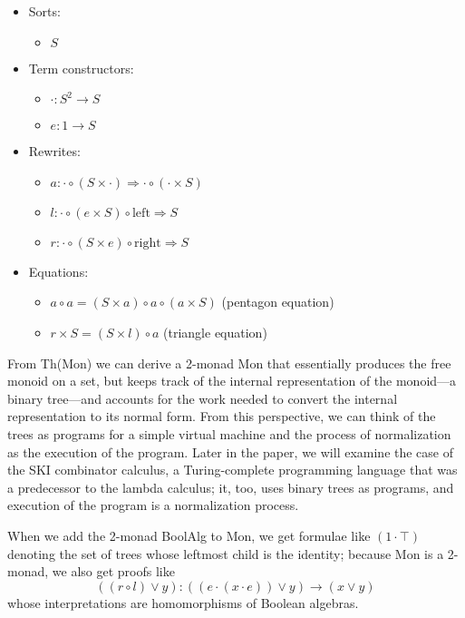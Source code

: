 \documentclass{article}
\newcommand{\maps}{\colon}
\newcommand{\leftu}{\mathrm{left}}
\newcommand{\rightu}{\mathrm{right}}
\begin{document}
\begin{center}
  \begin{itemize}
    \item Sorts:
    \begin{itemize}
      \item $S$
    \end{itemize}
    \item Term constructors:
    \begin{itemize}
      \item $\cdot\maps S^2 \to S$
      \item $e\maps 1 \to S$
    \end{itemize}
    \item Rewrites:
    \begin{itemize}
      \item $a\maps \cdot \circ (S \times \cdot) \Rightarrow \cdot \circ (\cdot \times S)$
      \item $l\maps \cdot \circ (e \times S) \circ \leftu \Rightarrow S$
      \item $r\maps \cdot \circ (S \times e) \circ \rightu \Rightarrow S$
    \end{itemize}
    \item Equations:
    \begin{itemize}
      \item $a \circ a = (S \times a) \circ a \circ (a \times S)$ (pentagon equation)
      \item $r \times S = (S \times l) \circ a$ (triangle equation)
    \end{itemize}
  \end{itemize}
\end{center}
From Th(Mon) we can derive a 2-monad Mon that essentially produces the free monoid on a set, but keeps track of the internal representation of the monoid---a binary tree---and accounts for the work needed to convert the internal representation to its normal form.  From this perspective, we can think of the trees as programs for a simple virtual machine and the process of normalization as the execution of the program.  Later in the paper, we will examine the case of the SKI combinator calculus, a Turing-complete programming language that was a predecessor to the lambda calculus; it, too, uses binary trees as programs, and execution of the program is a normalization process.

When we add the 2-monad BoolAlg to Mon, we get formulae like $(1 \cdot \top)$ denoting the set of trees whose leftmost child is the identity; because Mon is a 2-monad, we also get proofs like 
\[ ((r \circ l) \lor y)\maps ((e \cdot (x \cdot e)) \lor y) \to (x \lor y) \]
whose interpretations are homomorphisms of Boolean algebras.
\end{document}

